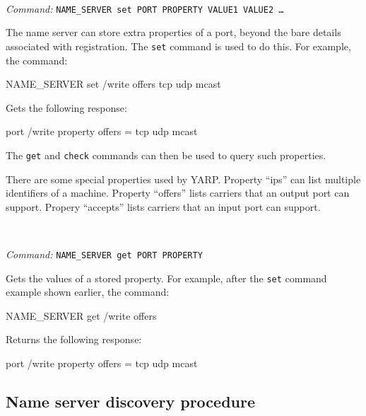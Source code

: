 \documentclass[a4]{article}
\newenvironment{codecase}[1]{\subsection{#1}}{}
\newenvironment{packed_itemize}{
\begin{itemize}
  \renewcommand{\labelitemi}{$\triangleright$}
  \setlength{\itemsep}{1pt}
  \setlength{\parskip}{0pt}
  \setlength{\parsep}{0pt}
}{\end{itemize}}
\newcommand{\newusage}{\ \\\noindent\makebox[\textwidth]{\hrulefill}}
\newcommand{\usage}[1]{ \begin{packed_itemize} \item {\it Command:} {\tt #1} \end{packed_itemize}}
\begin{document}
\newusage{}
\usage{NAME\_SERVER set PORT PROPERTY VALUE1 VALUE2 \ldots}

The name server can store extra properties of a port, beyond the
bare details associated with registration.  The {\tt set} command
is used to do this.  For example, the command:
\begin{code}
NAME_SERVER set /write offers tcp udp mcast
\end{code}
Gets the following response:
\begin{code}
port /write property offers = tcp udp mcast
\end{code}
The {\tt get} and {\tt check} commands can then be used to query
such properties.

There are some special properties used by YARP.  Property ``ips''
can list multiple identifiers of a machine.  Property ``offers''
lists carriers that an output port can support.  Propery ``accepts''
lists carriers that an input port can support.




\newusage
\usage{NAME\_SERVER get PORT PROPERTY}
Gets the values of a stored property. For example, 
after the {\tt set} command example shown earlier, the command:
\begin{code}
NAME_SERVER get /write offers
\end{code}
Returns the following response:
\begin{code}
port /write property offers = tcp udp mcast
\end{code}







\subsection{Name server discovery procedure}
\end{document}
